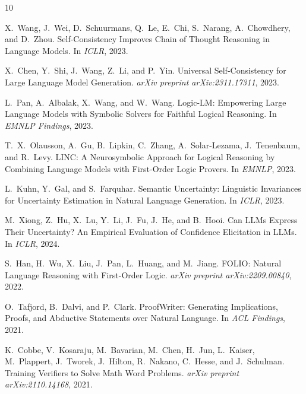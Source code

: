 \documentclass[11pt,a4paper]{article}
\begin{document}
\begin{thebibliography}{10}

X.~Wang, J.~Wei, D.~Schuurmans, Q.~Le, E.~Chi, S.~Narang, A.~Chowdhery, and D.~Zhou.
\newblock Self-Consistency Improves Chain of Thought Reasoning in Language Models.
\newblock In \emph{ICLR}, 2023.

X.~Chen, Y.~Shi, J.~Wang, Z.~Li, and P.~Yin.
\newblock Universal Self-Consistency for Large Language Model Generation.
\newblock \emph{arXiv preprint arXiv:2311.17311}, 2023.

L.~Pan, A.~Albalak, X.~Wang, and W.~Wang.
\newblock Logic-LM: Empowering Large Language Models with Symbolic Solvers for Faithful Logical Reasoning.
\newblock In \emph{EMNLP Findings}, 2023.

T.~X.~Olausson, A.~Gu, B.~Lipkin, C.~Zhang, A.~Solar-Lezama, J.~Tenenbaum, and R.~Levy.
\newblock LINC: A Neurosymbolic Approach for Logical Reasoning by Combining Language Models with First-Order Logic Provers.
\newblock In \emph{EMNLP}, 2023.

L.~Kuhn, Y.~Gal, and S.~Farquhar.
\newblock Semantic Uncertainty: Linguistic Invariances for Uncertainty Estimation in Natural Language Generation.
\newblock In \emph{ICLR}, 2023.

M.~Xiong, Z.~Hu, X.~Lu, Y.~Li, J.~Fu, J.~He, and B.~Hooi.
\newblock Can LLMs Express Their Uncertainty? An Empirical Evaluation of Confidence Elicitation in LLMs.
\newblock In \emph{ICLR}, 2024.

S.~Han, H.~Wu, X.~Liu, J.~Pan, L.~Huang, and M.~Jiang.
\newblock FOLIO: Natural Language Reasoning with First-Order Logic.
\newblock \emph{arXiv preprint arXiv:2209.00840}, 2022.

O.~Tafjord, B.~Dalvi, and P.~Clark.
\newblock ProofWriter: Generating Implications, Proofs, and Abductive Statements over Natural Language.
\newblock In \emph{ACL Findings}, 2021.

K.~Cobbe, V.~Kosaraju, M.~Bavarian, M.~Chen, H.~Jun, L.~Kaiser, M.~Plappert, J.~Tworek, J.~Hilton, R.~Nakano, C.~Hesse, and J.~Schulman.
\newblock Training Verifiers to Solve Math Word Problems.
\newblock \emph{arXiv preprint arXiv:2110.14168}, 2021.

\end{thebibliography}
\end{document}

